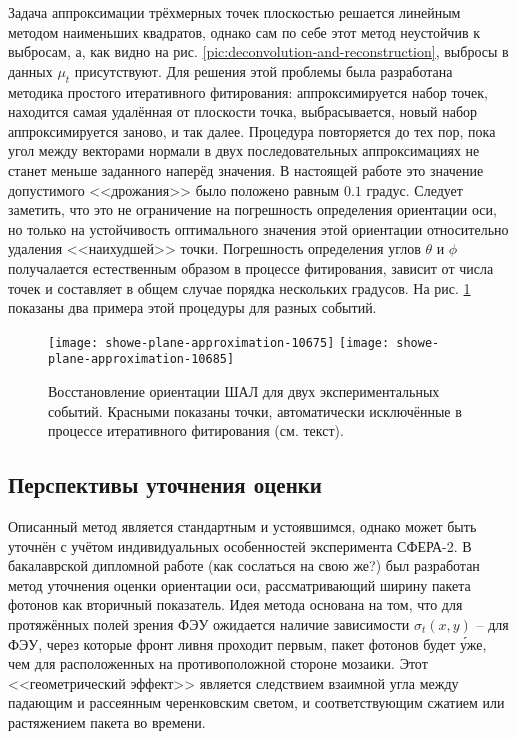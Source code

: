 Задача аппроксимации трёхмерных точек плоскостью решается линейным методом наименьших квадратов, однако сам по себе этот метод неустойчив к выбросам, а, как видно на рис. \ref{pic:deconvolution-and-reconstruction}, выбросы в данных $\mu_t$ присутствуют. Для решения этой проблемы была разработана методика простого итеративного фитирования: аппроксимируется набор точек, находится самая удалённая от плоскости точка, выбрасывается, новый набор аппроксимируется заново, и так далее. Процедура повторяется до тех пор, пока угол между векторами нормали в двух последовательных аппроксимациях не станет меньше заданного наперёд значения. В настоящей работе это значение допустимого <<дрожания>> было положено равным $0.1$ градус. Следует заметить, что это не ограничение на погрешность определения ориентации оси, но только на устойчивость оптимального значения этой ориентации относительно удаления <<наихудшей>> точки. Погрешность определения углов $\theta$ и $\phi$ получалается естественным образом в процессе фитирования, зависит от числа точек и составляет в общем случае порядка нескольких градусов. На рис. \ref{pic:plane-reconstruction} показаны два примера этой процедуры для разных событий.


\begin{figure}
	\centering
	\texttt{[image: showe-plane-approximation-10675]}
	\hfill
	\texttt{[image: showe-plane-approximation-10685]}
	\caption{Восстановление ориентации ШАЛ для двух экспериментальных событий. Красными показаны точки, автоматически исключённые в процессе итеративного фитирования (см. текст).}
	\label{pic:plane-reconstruction}
\end{figure}

\subsection{Перспективы уточнения оценки}

Описанный метод является стандартным и устоявшимся, однако может быть уточнён с учётом индивидуальных особенностей эксперимента СФЕРА-2. В бакалаврской дипломной работе (как сослаться на свою же?) был разработан метод уточнения оценки ориентации оси, рассматривающий ширину пакета фотонов как вторичный показатель. Идея метода основана на том, что для протяжённых полей зрения ФЭУ ожидается наличие зависимости $\sigma_t(x, y)$ -- для ФЭУ, через которые фронт ливня проходит первым, пакет фотонов будет \'{у}же, чем для расположенных на противоположной стороне мозаики. Этот <<геометрический эффект>> является следствием взаимной угла между падающим и рассеянным черенковским светом, и соответствующим сжатием или растяжением пакета во времени.

